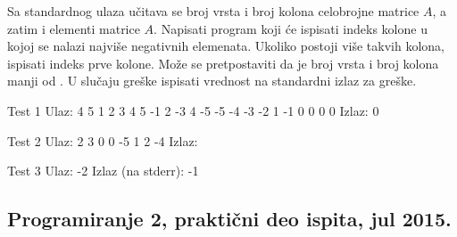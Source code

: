 \begin{Exercise}[label=903]
Sa standardnog ulaza učitava se broj vrsta i broj kolona celobrojne matrice $A$, a zatim i elementi matrice $A$. Napisati program koji će ispisati indeks kolone u kojoj se nalazi najviše negativnih elemenata. Ukoliko postoji više takvih kolona, ispisati indeks prve kolone. Može se pretpostaviti da je broj vrsta i broj kolona manji od . U slučaju greške ispisati vrednost  na standardni izlaz za greške. 

\begin{minitest}
\begin{test}{Test 1}
Ulaz:                         
  4                             
  5                                                               
  1  2  3  4  5               
 -1  2 -3  4 -5                
 -5 -4 -3 -2  1               
 -1  0  0  0  0 
 Izlaz:                         
  0                                                    
\end{test}
\end{minitest}
\begin{minitest}
\begin{test}{Test 2}
Ulaz:                         
 2                               
 3                                 
 0 0 -5
 1 2 -4
Izlaz:   
\end{test}
\end{minitest}
\begin{minitest}
\begin{test}{Test 3}
Ulaz:                         
 -2
Izlaz (na stderr):
 -1
\end{test}
\end{minitest}


\end{Exercise}
\begin{Answer}[ref=903]
\end{Answer}

\subsection*{Programiranje 2, praktični deo ispita, jul 2015.}


